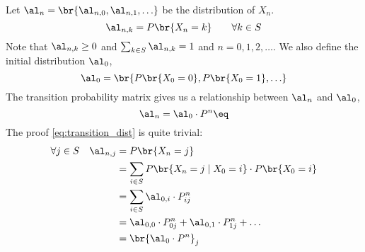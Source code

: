 \documentclass{article}
\begin{document}
Let $\al_n = \br{\al_{n, 0}, \al_{n, 1}, \ldots}$ be the distribution of $X_n$.
\[ \al_{n,k} = P\br{X_n = k} \qquad \forall k \in S \]
Note that $\al_{n,k} \geq 0$ and $\sum_{k\in S} \al_{n, k} = 1$ and $n = 0, 1, 2,\ldots$. We also define the initial distribution $\al_0$,
\[ \al_0 = \br{P\br{X_0 = 0}, P\br{X_0 = 1}, \ldots} \]
The transition probability matrix gives us a relationship between $\al_n$ and $\al_0$,
\[ \al_n = \al_0 \cdot P^{n} \eq \label{eq:transition_dist}\]
The proof \cref{eq:transition_dist} is quite trivial:
\begin{align*}
    \forall j \in S \quad \al_{n, j} &= P\br{X_n = j} \\
     &= \sum_{i \in S} P\br{X_n = j \mid X_0 = i} \cdot P\br{X_0 = i} \\
     &= \sum_{i \in S} \al_{0, i} \cdot P_{ij}^{n} \\
     &= \al_{0, 0} \cdot P_{0j}^{n} + \al_{0, 1} \cdot P_{1j}^{n} + \ldots \\
     &= \br{\al_{0} \cdot P^{n}}_j
\end{align*}
\[  \]
\end{document}
